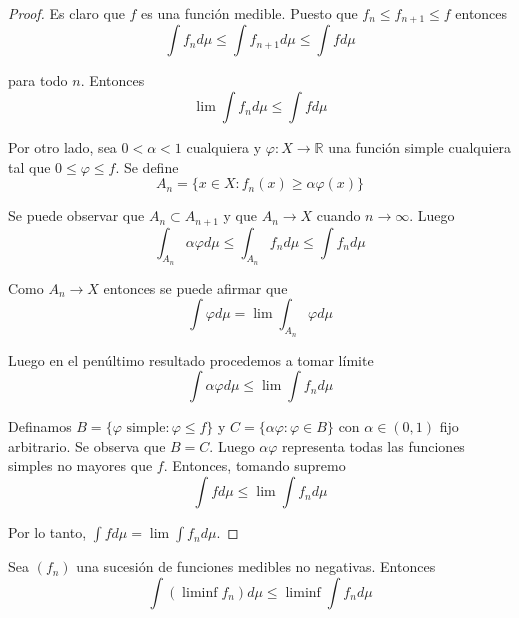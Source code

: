\begin{proof}
	Es claro que $f$ es una función medible. Puesto que $f_n \leq f_{n+1} \leq f$ entonces
	\begin{equation}
		\int f_n d\mu \leq \int f_{n+1} d\mu \leq \int f d\mu
	\end{equation}
	
	para todo $n$. Entonces
	\begin{equation}
		\lim \int f_n d\mu \leq \int f d\mu
	\end{equation}
	
	Por otro lado, sea $0 < \alpha < 1$ cualquiera y $\varphi: X \rightarrow \mathbb{R}$ una función simple cualquiera tal que $0 \leq \varphi \leq f$. Se define
	\begin{equation}
		A_n = \{ x \in X: f_n(x) \geq \alpha \varphi(x) \}
	\end{equation}
	
	Se puede observar que $A_n \subset A_{n+1}$ y que $A_n \rightarrow X$ cuando $n \rightarrow \infty$. Luego
	\begin{equation}
		\int_{A_n} \alpha \varphi d\mu \leq \int_{A_n} f_n d\mu \leq \int f_n d\mu
	\end{equation}
	
	Como $A_n \rightarrow X$ entonces se puede afirmar que
	\begin{equation}
		\int \varphi d\mu = \lim \int_{A_n} \varphi d\mu
	\end{equation}
	
	Luego en el penúltimo resultado procedemos a tomar límite
	\begin{equation}
		\int \alpha \varphi d\mu \leq \lim \int f_n d\mu
	\end{equation}
	
	Definamos $B=\{\varphi \text{ simple}: \varphi \leq f \}$ y $C = \{ \alpha \varphi: \varphi \in B \}$ con \mbox{$\alpha \in (0,1)$} fijo arbitrario. Se observa que $B=C$. Luego $\alpha \varphi$ representa todas las funciones simples no mayores que $f$. Entonces, tomando supremo
	\begin{equation}
		\int f d\mu \leq \lim \int f_n d\mu
	\end{equation}	
	
	Por lo tanto, $\int f d\mu = \lim \int f_n d\mu$.
\end{proof}

\begin{teorema}\label{fatou}
	Sea $(f_n)$ una sucesión de funciones medibles no negativas. Entonces
	\begin{equation}
		\int (\liminf f_n) d\mu \leq \liminf \int f_n d\mu
	\end{equation}
\end{teorema}


